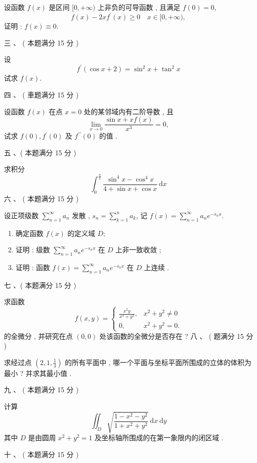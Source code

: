 \documentclass[10pt]{article}
\begin{document}
{ 设函数  $f(x)$  是区间  $[0,+\infty)$  上非负的可导函数 ,  且满足  $f(0)=0$,
$$
f(x)-2 x f^{\prime}(x) \geqslant 0 \quad x \in[0,+\infty),
$$
 证明 : $f(x) \equiv 0$.

 三 、 ( 本题满分  15  分 )

 设 
$$
f^{\prime}(\cos x+2)=\sin ^{2} x+\tan ^{2} x
$$
 试求  $f(x)$.

 四 、 ( 車题满分  15  分 )

 设函数  $f(x)$  在点  $x=0$  处的某邻域内有二阶导数 ,  且 
$$
\lim _{x \rightarrow 0} \frac{\sin x+x f(x)}{x^{3}}=0,
$$
 试求  $f(0), f^{\prime}(0)$  及  $f^{\prime \prime}(0)$  的值 .

 五 、( 本题满分  15  分 )

 求积分 
$$
\int_{0}^{\frac{\pi}{2}} \frac{\sin ^{4} x-\cos ^{4} x}{4+\sin x+\cos x} \mathrm{~d} x
$$
 六 、 ( 本题满分  15  分 )

 设正项级数  $\sum_{n=1}^{\infty} a_{n}$  发散 , $s_{n}=\sum_{k=1}^{n} a_{k}$,  记  $f(x)=\sum_{n=1}^{\infty} a_{n} e^{-s_{n} x}$.

\begin{enumerate}
  \item  确定函数  $f(x)$  的定义域  $D$;

  \item  证明 :  级数  $\sum_{n=1}^{\infty} a_{n} e^{-s_{n} x}$  在  $D$  上非一致收敛 ;

  \item  证明 :  函数  $f(x)=\sum_{n=1}^{\infty} a_{n} e^{-s_{n} x}$  在  $D$  上连续 .

\end{enumerate}
 七 、( 本题满分  15  分 )

 求函数 
$$
f(x, y)= \begin{cases}\frac{x^{2} y}{x^{4}+y^{2}}, & x^{2}+y^{2} \neq 0 \\ 0, & x^{2}+y^{2}=0 .\end{cases}
$$
 的全微分 ,  并研究在点  $(0,0)$  处该函数的全微分是否存在 ?  八 、 ( 题满分  15  分 )

 求经过点  $\left(2,1, \frac{1}{3}\right)$  的所有平面中 ,  哪一个平面与坐标平面所围成的立体的体积为最小 ?  并求其最小值 .

 九 、 ( 本题满分  15  分 )

 计算 
$$
\iint_{D} \sqrt{\frac{1-x^{2}-y^{2}}{1+x^{2}+y^{2}}} \mathrm{~d} x \mathrm{~d} y
$$
 其中  $D$  是由圆周  $x^{2}+y^{2}=1$  及坐标轴所围成的在第一象限内的闭区域 .

 十 、 ( 本题满分  15  分 )

}
\end{document}

